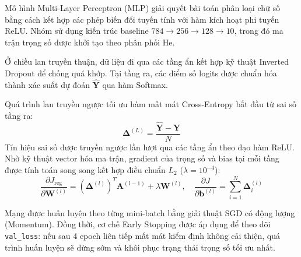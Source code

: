 \documentclass[11pt,a4paper]{article}
\begin{document}
Mô hình Multi-Layer Perceptron (MLP) giải quyết bài toán phân loại chữ số bằng cách kết hợp các phép biến đổi tuyến tính với hàm kích hoạt phi tuyến ReLU. Nhóm sử dụng kiến trúc baseline $784 \to 256 \to 128 \to 10$, trong đó ma trận trọng số được khởi tạo theo phân phối He.

Ở chiều lan truyền thuận, dữ liệu đi qua các tầng ẩn kết hợp kỹ thuật Inverted Dropout để chống quá khớp. Tại tầng ra, các điểm số logits được chuẩn hóa thành xác suất dự đoán $\hat{\mathbf{Y}}$ qua hàm Softmax.

Quá trình lan truyền ngược tối ưu hàm mất mát Cross-Entropy bắt đầu từ sai số tầng ra:
\begin{equation}
    \boldsymbol{\Delta}^{(L)} = \frac{\hat{\mathbf{Y}} - \mathbf{Y}}{N}
\end{equation}
Tín hiệu sai số được truyền ngược lần lượt qua các tầng ẩn theo đạo hàm ReLU. Nhờ kỹ thuật vector hóa ma trận, gradient của trọng số và bias tại mỗi tầng được tính toán song song kết hợp điều chuẩn $L_2$ ($\lambda = 10^{-4}$):
\begin{equation}
    \frac{\partial J_{\text{reg}}}{\partial \mathbf{W}^{(l)}} = (\boldsymbol{\Delta}^{(l)})^T \mathbf{A}^{(l-1)} + \lambda \mathbf{W}^{(l)}, \quad \frac{\partial J}{\partial \mathbf{b}^{(l)}} = \sum_{i=1}^N \boldsymbol{\Delta}_i^{(l)}
\end{equation}

Mạng được huấn luyện theo từng mini-batch bằng giải thuật SGD có động lượng (Momentum). Đồng thời, cơ chế Early Stopping được áp dụng để theo dõi \texttt{val\_loss}: nếu sau 4 epoch liên tiếp mất mát kiểm định không cải thiện, quá trình huấn luyện sẽ dừng sớm và khôi phục trạng thái trọng số tối ưu nhất.
\end{document}
